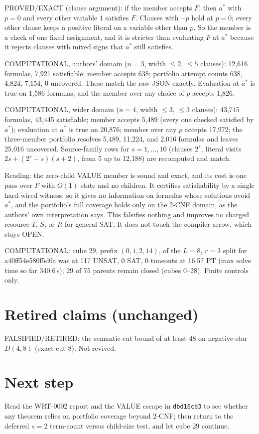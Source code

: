 \documentclass[11pt]{article}
\begin{document}
PROVED/EXACT (clause argument): if the member accepts $F$, then $a^\ast$ with $p=0$ and every other variable $1$ satisfies $F$. Clauses with $\neg p$ hold at $p=0$; every other clause keeps a positive literal on a variable other than $p$. So the member is a check of one fixed assignment, and it is stricter than evaluating $F$ at $a^\ast$ because it rejects clauses with mixed signs that $a^\ast$ still satisfies.

COMPUTATIONAL, authors' domain ($n=3$, width $\le 2$, $\le 5$ clauses): 12{,}616 formulas, 7{,}921 satisfiable; member accepts 638; portfolio attempt counts 638, 4{,}824, 7{,}154, 0 uncovered. These match the raw JSON exactly. Evaluation at $a^\ast$ is true on 1{,}586 formulas, and the member over any choice of $p$ accepts 1{,}826.

COMPUTATIONAL, wider domain ($n=4$, width $\le 3$, $\le 3$ clauses): 43{,}745 formulas, 43{,}445 satisfiable; member accepts 5{,}489 (every one checked satisfied by $a^\ast$); evaluation at $a^\ast$ is true on 20{,}876; member over any $p$ accepts 17{,}972; the three-member portfolio resolves 5{,}489, 11{,}224, and 2{,}016 formulas and leaves 25{,}016 uncovered. Source-family rows for $s=1,\dots,10$ (clauses $2^s$, literal visits $2s+(2^s-s)(s+2)$, from 5 up to 12{,}188) are recomputed and match.

Reading: the zero-child VALUE member is sound and exact, and its cost is one pass over $F$ with $O(1)$ state and no children. It certifies satisfiability by a single hard-wired witness, so it gives no information on formulas whose solutions avoid $a^\ast$, and the portfolio's full coverage holds only on the 2-CNF domain, as the authors' own interpretation says. This falsifies nothing and improves no charged resource $T$, $S$, or $R$ for general SAT. It does not touch the compiler arrow, which stays OPEN.

COMPUTATIONAL: cube 29, prefix $(0,1,2,14)$, of the $L=8$, $r=3$ split for a40ff54e580f5d0a was at 117 UNSAT, 0 SAT, 0 timeouts at 16:57 PT (max solve time so far 340.6\,s); 29 of 75 parents remain closed (cubes 0--28). Finite controls only.

\section*{Retired claims (unchanged)}
FALSIFIED/RETIRED: the semantic-cut bound of at least 48 on negative-star $D(4,8)$ (exact cut 8). Not revived.

\section*{Next step}
Read the WRT-0002 report and the VALUE escape in \texttt{dbd16cb3} to see whether any theorem relies on portfolio coverage beyond 2-CNF; then return to the deferred $s=2$ term-count versus child-size test, and let cube 29 continue.
\end{document}
